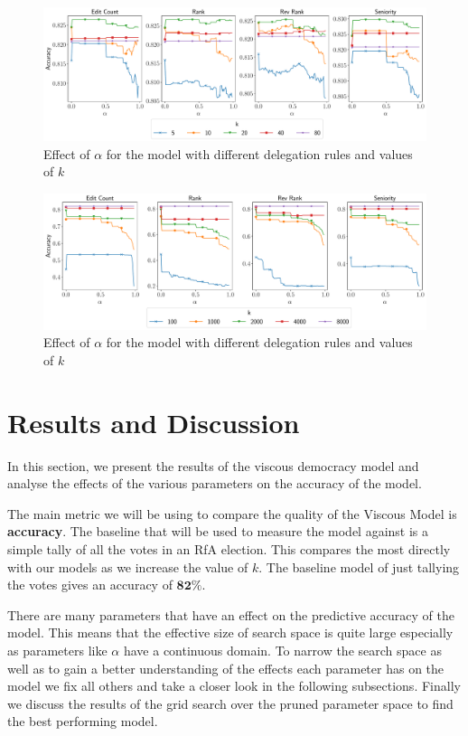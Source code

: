 \begin{figure}[t]
    \centering
    \includegraphics[width=\linewidth]{images/alpha_local.pdf}
    \caption{Effect of $\alpha$ for the \localv model with different delegation rules and values of $k$}
    \label{fig:local-alpha}
\end{figure}
\begin{figure}[t]
    \centering
    \includegraphics[width=\linewidth]{images/alpha_global.pdf}
    \caption{Effect of $\alpha$ for the \globalv model with different delegation rules and values of $k$}
    \label{fig:global-alpha}
\end{figure}

\section{Results and Discussion}

\label{sec:results}
In this section, we present the results of the viscous democracy model and analyse the effects of the various parameters on the accuracy of the model.

The main metric we will be using to compare the quality of the Viscous Model is \textbf{accuracy}. The baseline that will be used to measure the model against is a simple tally of all the votes in an RfA election. This compares the most directly with our models as we increase the value of $k$. The baseline model of just tallying the votes gives an accuracy of $\mathbf{82\%}$. 

There are many parameters that have an effect on the predictive accuracy of the model. This means that the effective size of search space is quite large especially as parameters like $\alpha$ have a continuous domain. To narrow the search space as well as to gain a better understanding of the effects each parameter has on the model we fix all others and take a closer look in the following subsections. Finally we discuss the results of the grid search over the pruned parameter space to find the best performing model.

